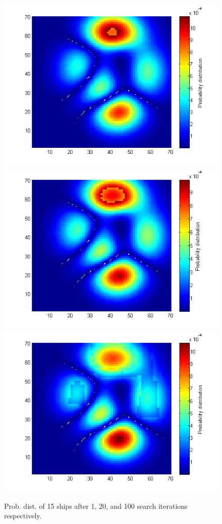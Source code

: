 \documentclass[a4paper]{article}
\begin{document}
\begin{figure}[H]\begin{center}
\includegraphics[scale=0.35]{../Matlab/Images/ModelSearch001.png}
\includegraphics[scale=0.35]{../Matlab/Images/ModelSearch020.png}
\includegraphics[scale=0.35]{../Matlab/Images/ModelSearch100.png}
\caption{Prob. dist. of 15 ships after 1, 20, and 100 search iterations respectively.}
\end{center}\end{figure}
\end{document}
